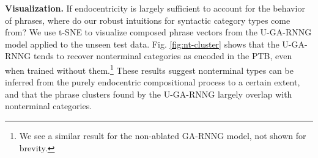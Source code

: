 \documentclass[11pt]{article}
\newcommand{\ask}[1]{\textcolor{orange}{{\textbf{[#1 --\textsc{ask}]}}}}
\newcommand{\nascomment}[1]{\textcolor{blue}{{\textbf{[#1 --\textsc{nas}]}}}}
\newcommand{\miguelcomment}[1]{\textcolor{red}{{\textbf{[#1 --\textsc{miguel}]}}}}
\renewcommand{\ask}[1]{}
\renewcommand{\nascomment}[1]{}
\renewcommand{\miguelcomment}[1]{}
\begin{document}
\textbf{Visualization.} If endocentricity is largely sufficient to account for the behavior of phrases, where do our robust intuitions for syntactic category types come from? We use t-SNE \cite{maaten_08} to visualize composed phrase vectors from the U-GA-RNNG model applied to the unseen test data.
Fig. \ref{fig:nt-cluster} shows that the U-GA-RNNG tends to recover nonterminal categories as encoded in the PTB, even when trained without them.\footnote{We see a similar result for the non-ablated GA-RNNG model, not shown for brevity.} These results suggest nonterminal types can be inferred from the purely endocentric compositional process to a certain extent, and that the phrase clusters found by the U-GA-RNNG largely overlap with nonterminal categories.  


\end{document}
